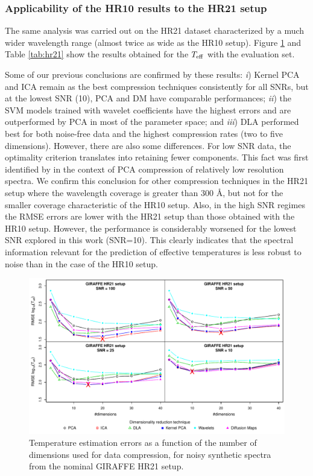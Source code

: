\documentclass[a4paper,fleqn,usenatbib]{mnras}
\begin{document}
{%
\subsubsection{Applicability of the HR10 results to the HR21 setup}

The same analysis was carried out on the HR21 dataset characterized by  
a much wider wavelength range (almost twice as wide as the HR10 setup).
Figure \ref{fig:02hr21} and Table \ref{tab:hr21} show the results 
obtained for the $T_{\rm eff}$ with the evaluation set.

Some of our previous conclusions are confirmed by these results:
{\it i}) Kernel PCA and ICA remain as the best compression techniques 
consistently for all SNRs, but at the lowest SNR (10), PCA and DM have 
comparable performances;  {\it ii}) the SVM models trained with wavelet 
coefficients have the highest errors and are outperformed by PCA 
in most of the parameter space; and {\it iii}) DLA performed best for 
both noise-free data and the highest compression rates (two to five 
dimensions). However, there are also some differences. For low SNR 
data, the optimality criterion translates into retaining fewer components. 
This fact was first identified by \cite{Bailer-Jones1998} in the context of 
PCA compression of relatively low resolution spectra. We confirm this 
conclusion for other compression techniques in the HR21 setup where the 
wavelength coverage is greater than 300 {\AA}, but not for the smaller 
coverage characteristic of the HR10 setup.
Also, in the high SNR regimes the RMSE errors are lower with the HR21 
setup than those obtained with the HR10 setup. However, the performance is 
considerably worsened for the lowest SNR explored in this work (SNR=10). 
This clearly indicates that the spectral information relevant for the 
prediction of effective temperatures is less robust to noise than in 
the case of the HR10 setup.

\begin{figure}
\centering\includegraphics[width=\textwidth]{flamesHR21_Teff_log_BestSVM_N-RMSE_test.pdf}
\caption{Temperature estimation errors as a function of the number of
  dimensions used for data compression, for noisy synthetic
  spectra from the nominal GIRAFFE HR21 setup.}
\label{fig:02hr21}
\end{figure}


}
\end{document}
